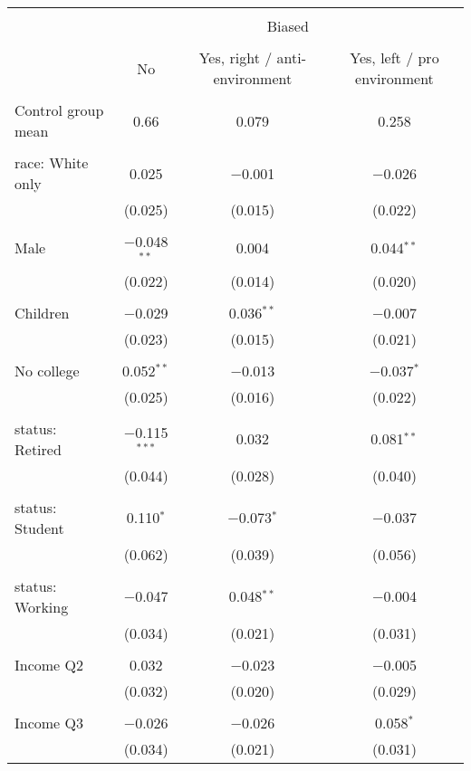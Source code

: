 
\begin{tabular}{@{\extracolsep{5pt}}lccc} 
\\[-1.8ex]\hline 
\hline \\[-1.8ex] 
 & \multicolumn{3}{c}{Biased} \\ 
\cline{2-4} 
\\[-1.8ex] & No & Yes, right / anti-environment & Yes, left / pro environment \\ 
\hline \\[-1.8ex] 
 Control group mean & 0.66 & 0.079 & 0.258  \\ \hline \\[-1.8ex] race: White only & 0.025 & $-$0.001 & $-$0.026 \\ 
  & (0.025) & (0.015) & (0.022) \\ 
  & & & \\ 
 Male & $-$0.048$^{**}$ & 0.004 & 0.044$^{**}$ \\ 
  & (0.022) & (0.014) & (0.020) \\ 
  & & & \\ 
 Children & $-$0.029 & 0.036$^{**}$ & $-$0.007 \\ 
  & (0.023) & (0.015) & (0.021) \\ 
  & & & \\ 
 No college & 0.052$^{**}$ & $-$0.013 & $-$0.037$^{*}$ \\ 
  & (0.025) & (0.016) & (0.022) \\ 
  & & & \\ 
 status: Retired & $-$0.115$^{***}$ & 0.032 & 0.081$^{**}$ \\ 
  & (0.044) & (0.028) & (0.040) \\ 
  & & & \\ 
 status: Student & 0.110$^{*}$ & $-$0.073$^{*}$ & $-$0.037 \\ 
  & (0.062) & (0.039) & (0.056) \\ 
  & & & \\ 
 status: Working & $-$0.047 & 0.048$^{**}$ & $-$0.004 \\ 
  & (0.034) & (0.021) & (0.031) \\ 
  & & & \\ 
 Income Q2 & 0.032 & $-$0.023 & $-$0.005 \\ 
  & (0.032) & (0.020) & (0.029) \\ 
  & & & \\ 
 Income Q3 & $-$0.026 & $-$0.026 & 0.058$^{*}$ \\ 
  & (0.034) & (0.021) & (0.031) \\ 

\end{tabular}
